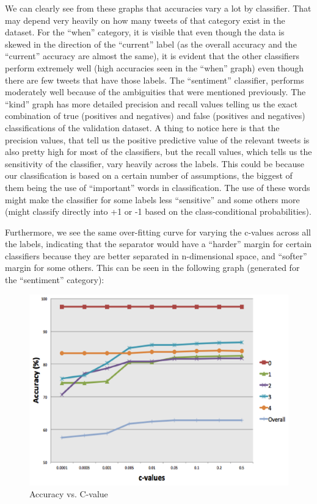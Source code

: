 We can clearly see from these graphs that accuracies vary a lot by classifier. That may depend very heavily on how many tweets of that category exist in the dataset. For the ``when'' category, it is visible that even though the data is skewed in the direction of the ``current'' label (as the overall accuracy and the ``current'' accuracy are almost the same), it is evident that the other classifiers perform extremely well (high accuracies seen in the ``when'' graph) even though there are few tweets that have those labels. The ``sentiment'' classifier, performs moderately well because of the ambiguities that were mentioned previously. The ``kind'' graph has more detailed precision and recall values telling us the exact combination of true (positives and negatives) and false (positives and negatives) classifications of the validation dataset. A thing to notice here is that the precision values, that tell us the positive predictive value of the relevant tweets is also pretty high for most of the classifiers, but the recall values, which tells us the sensitivity of the classifier, vary heavily across the labels. This could be because our classification is based on a certain number of assumptions, the biggest of them being the use of ``important'' words in classification. The use of these words might make the classifier for some labels less ``sensitive'' and some others more (might classify directly into +1 or -1 based on the class-conditional probabilities).
 
Furthermore, we see the same over-fitting curve for varying the c-values across all the labels, indicating that the separator would have a ``harder'' margin for certain classifiers because they are better separated in n-dimensional space, and ``softer'' margin for some others. This can be seen in the following graph (generated for the ``sentiment'' category):


\begin{figure}[H]
%
  \includegraphics[width=\linewidth]{results/svmCValue}
  \caption{Accuracy vs. C-value}\label{fig:svmCValue}
\endminipage
\end{figure}


